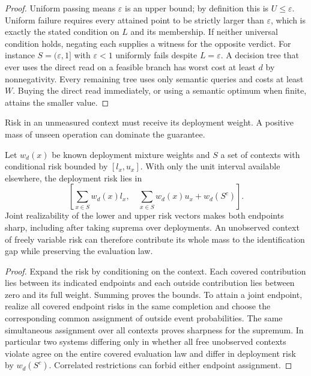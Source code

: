 \begin{proof}

Uniform passing means \(\varepsilon\) is an upper bound; by definition this is \(U\le\varepsilon\). Uniform failure requires every attained point to be strictly larger than \(\varepsilon\), which is exactly the stated condition on \(L\) and its membership. If neither universal condition holds, negating each supplies a witness for the opposite verdict. For instance \(S=(\varepsilon,1]\) with \(\varepsilon<1\) uniformly fails despite \(L=\varepsilon\). A decision tree that ever uses the direct read on a feasible branch has worst cost at least \(d\) by nonnegativity. Every remaining tree uses only semantic queries and costs at least \(W\). Buying the direct read immediately, or using a semantic optimum when finite, attains the smaller value.

\end{proof}

Risk in an unmeasured context must receive its deployment weight. A positive mass of unseen operation can dominate the guarantee.

\begin{theorem}\label{thm:t20}

Let \(w_d(x)\) be known deployment mixture weights and \(S\) a set of contexts with conditional risk bounded by \([l_x,u_x]\). With only the unit interval available elsewhere, the deployment risk lies in
\[
\left[\sum_{x\in S}w_d(x)l_x,\quad
\sum_{x\in S}w_d(x)u_x+w_d(S^c)\right].
\]
Joint realizability of the lower and upper risk vectors makes both endpoints sharp, including after taking suprema over deployments. An unobserved context of freely variable risk can therefore contribute its whole mass to the identification gap while preserving the evaluation law.

\end{theorem}

\begin{proof}

Expand the risk by conditioning on the context. Each covered contribution lies between its indicated endpoints and each outside contribution lies between zero and its full weight. Summing proves the bounds. To attain a joint endpoint, realize all covered endpoint risks in the same completion and choose the corresponding common assignment of outside event probabilities. The same simultaneous assignment over all contexts proves sharpness for the supremum. In particular two systems differing only in whether all free unobserved contexts violate agree on the entire covered evaluation law and differ in deployment risk by \(w_d(S^c)\). Correlated restrictions can forbid either endpoint assignment.

\end{proof}

